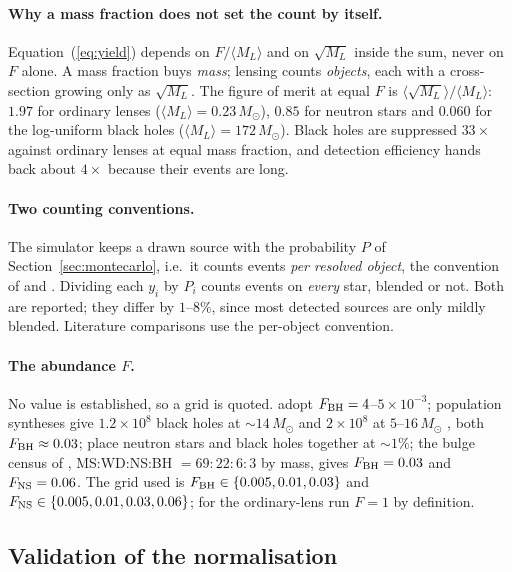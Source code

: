 \documentclass[english,10pt,a4paper]{article}
\begin{document}
	\paragraph{Why a mass fraction does not set the count by itself.} Equation~(\ref{eq:yield}) depends on $F/\langle M_L\rangle$ and on $\sqrt{M_L}$ inside the sum, never on $F$ alone. A mass fraction buys \emph{mass}; lensing counts \emph{objects}, each with a cross-section growing only as $\sqrt{M_L}$. The figure of merit at equal $F$ is $\langle\sqrt{M_L}\rangle/\langle M_L\rangle$: $1.97$ for ordinary lenses ($\langle M_L\rangle = 0.23\,M_\odot$), $0.85$ for neutron stars and $0.060$ for the log-uniform black holes ($\langle M_L\rangle = 172\,M_\odot$). Black holes are suppressed $33\times$ against ordinary lenses at equal mass fraction, and detection efficiency hands back about $4\times$ because their events are long.

	\paragraph{Two counting conventions.} The simulator keeps a drawn source with the probability $P$ of Section~\ref{sec:montecarlo}, i.e.\ it counts events \emph{per resolved object}, the convention of \cite{SajadianSahu2023} and \cite{SajadianMakler2026}. Dividing each $y_i$ by $P_i$ counts events on \emph{every} star, blended or not. Both are reported; they differ by $1$--$8\%$, since most detected sources are only mildly blended. Literature comparisons use the per-object convention.

	\paragraph{The abundance $F$.} No value is established, so a grid is quoted. \cite{SajadianMakler2026} adopt $F_{\rm BH} = 4$--$5\times10^{-3}$; population syntheses give $1.2\times10^8$ black holes at $\sim\!14\,M_\odot$ \cite{Olejak2020} and $2\times10^8$ at $5$--$16\,M_\odot$ \cite{Lam2020}, both $F_{\rm BH}\approx0.03$; \cite{Sweeney2022} place neutron stars and black holes together at $\sim\!1\%$; the bulge census of \cite{Gould2000}, MS:WD:NS:BH $= 69\!:\!22\!:\!6\!:\!3$ by mass, gives $F_{\rm BH} = 0.03$ and $F_{\rm NS} = 0.06$. The grid used is $F_{\rm BH}\in\{0.005, 0.01, 0.03\}$ and $F_{\rm NS}\in\{0.005, 0.01, 0.03, 0.06\}$; for the ordinary-lens run $F=1$ by definition.

	\subsection{Validation of the normalisation}
\end{document}
